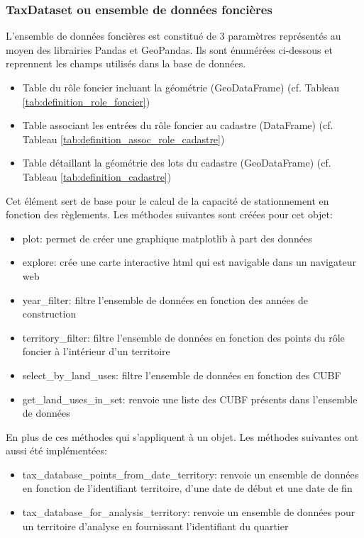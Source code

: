         \subsubsection{TaxDataset ou ensemble de données foncières}
        L'ensemble de données foncières est constitué de 3 paramètres représentés au moyen des librairies Pandas et GeoPandas. Ils sont énumérées ci-dessous et reprennent les champs utilisés dans la base de données.
        \begin{itemize}
            \item Table du rôle foncier incluant la géométrie (GeoDataFrame) (cf. Tableau \ref{tab:definition_role_foncier})
            \item Table associant les entrées du rôle foncier au cadastre (DataFrame) (cf. Tableau \ref{tab:definition_assoc_role_cadastre})
            \item Table détaillant la géométrie des lots du cadastre (GeoDataFrame) (cf. Tableau \ref{tab:definition_cadastre})
        \end{itemize}
        Cet élément sert de base pour le calcul de la capacité de stationnement en fonction des règlements. Les méthodes suivantes sont créées pour cet objet: 
        \begin{itemize}
            \item plot: permet de créer une graphique matplotlib à part des données
            \item explore: crée une carte interactive html qui est navigable dans un navigateur web
            \item year\_filter: filtre l'ensemble de données en fonction des années de construction
            \item territory\_filter: filtre l'ensemble de données en fonction des points du rôle foncier à l'intérieur d'un territoire
            \item select\_by\_land\_uses: filtre l'ensemble de données en fonction des \ac{CUBF}
            \item get\_land\_uses\_in\_set: renvoie une liste des \ac{CUBF} présents dans l'ensemble de données
        \end{itemize}
        En plus de ces méthodes qui s'appliquent à un objet. Les méthodes suivantes ont aussi été implémentées:
        \begin{itemize}
            \item tax\_database\_points\_from\_date\_territory: renvoie un ensemble de données en fonction de l'identifiant territoire, d'une date de début et une date de fin
            \item tax\_database\_for\_analysis\_territory: renvoie un ensemble de données pour un territoire d'analyse en fournissant l'identifiant du quartier
        \end{itemize}
        
